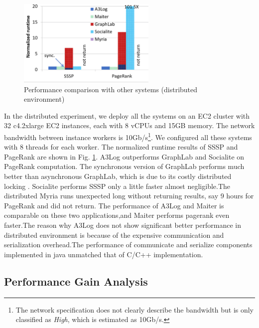 \begin{figure}[!t]
	\vspace{0.0in}
	\centering
	\includegraphics[width=2.6in]{fig/dist-result}
	\vspace{-0.1in}
	\caption{Performance comparison with other systems (distributed environment)}
	\label{fig:dist-result}
	\vspace{-0.2in}
\end{figure}

In the distributed experiment, we deploy all the systems on an EC2 cluster with 32 c4.2xlarge EC2 instances, each with 8 vCPUs and 15GB memory. The network bandwidth between instance workers is 10Gb/s\footnote{The network specification does not clearly describe the bandwidth but is only classified as \emph{High}, which is estimated as 10Gb/s.}. We configured all these systems with 8 threads for each worker. The normalized runtime results of SSSP and PageRank are shown in Fig. \ref{fig:dist-result}. A3Log outperforms GraphLab and Socialite on PageRank computation. The synchronous version of GraphLab performs much better than asynchronous GraphLab, which is due to its costly distributed locking \cite{Han:2015:GUB:2777598.2777604,Low:2012:DGF:2212351.2212354}. Socialite performs SSSP only a little faster almost negligible.The distributed Myria runs unexpected long without returning results, say 9 hours for PageRank and did not return. The performance of A3Log and Maiter is comparable on these two applications,and Maiter performs pagerank even faster.The reason why A3Log does not show significant better performance in distributed environment is because of the expensive communication and serialization overhead.The performance of communicate and serialize components implemented in java unmatched that of C/C++ implementation. 
\subsection{Performance Gain Analysis}
\label{sec:expr:optimizations}

